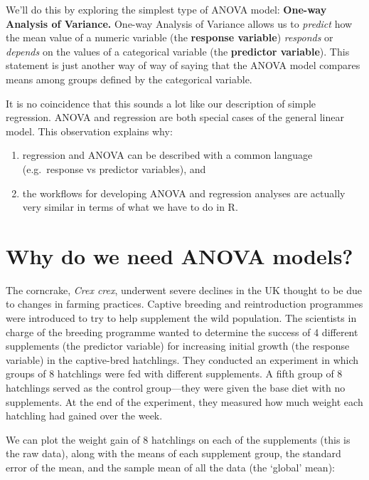 \documentclass[
]{book}
\providecommand{\tightlist}{%
  \setlength{\itemsep}{0pt}\setlength{\parskip}{0pt}}
\begin{document}
We'll do this by exploring the simplest type of ANOVA model: \textbf{One-way Analysis of Variance.} One-way Analysis of Variance allows us to \emph{predict} how the mean value of a numeric variable (the \textbf{response variable}) \emph{responds} or \emph{depends} on the values of a categorical variable (the \textbf{predictor variable}). This statement is just another way of way of saying that the ANOVA model compares means among groups defined by the categorical variable.

It is no coincidence that this sounds a lot like our description of simple regression. ANOVA and regression are both special cases of the general linear model. This observation explains why:

\begin{enumerate}
\def\labelenumi{\arabic{enumi}.}
\tightlist
\item
  regression and ANOVA can be described with a common language (e.g.~response vs predictor variables), and
\item
  the workflows for developing ANOVA and regression analyses are actually very similar in terms of what we have to do in R.
\end{enumerate}

\hypertarget{why-do-we-need-anova-models}{%
\section{Why do we need ANOVA models?}\label{why-do-we-need-anova-models}}

The corncrake, \emph{Crex crex}, underwent severe declines in the UK thought to be due to changes in farming practices. Captive breeding and reintroduction programmes were introduced to try to help supplement the wild population. The scientists in charge of the breeding programme wanted to determine the success of 4 different supplements (the predictor variable) for increasing initial growth (the response variable) in the captive-bred hatchlings. They conducted an experiment in which groups of 8 hatchlings were fed with different supplements. A fifth group of 8 hatchlings served as the control group---they were given the base diet with no supplements. At the end of the experiment, they measured how much weight each hatchling had gained over the week.

We can plot the weight gain of 8 hatchlings on each of the supplements (this is the raw data), along with the means of each supplement group, the standard error of the mean, and the sample mean of all the data (the `global' mean):
\end{document}
